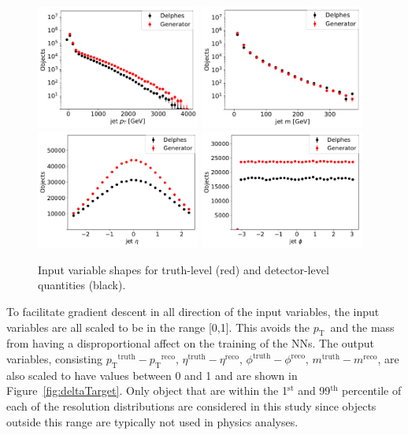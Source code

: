 \documentclass[showpacs,showkeys,preprint,prd,nofootinbib,linenumbers,12pt]{revtex4-1}
\def\pt{\ensuremath{p_{\mathrm{T}}}}
\def\ptRes{\ensuremath{\pt^{\mathrm{truth}}-\pt^{\mathrm{reco}}}}
\def\etaRes{\ensuremath{\eta^{\mathrm{truth}}-\eta^{\mathrm{reco}}}}
\def\phiRes{\ensuremath{\phi^{\mathrm{truth}}-\phi^{\mathrm{reco}}}}
\def\mRes{\ensuremath{m^{\mathrm{truth}}-m^{\mathrm{reco}}}}
\begin{document}
\begin{figure}[h]
  \includegraphics[width=0.48\textwidth]{jet_pT_prescaling_log.pdf}
  \includegraphics[width=0.48\textwidth]{jet_m_prescaling_log.pdf}\\
  \includegraphics[width=0.48\textwidth]{jet_eta_prescaling.pdf}
  \includegraphics[width=0.48\textwidth]{jet_phi_prescaling.pdf}
  \caption{Input variable shapes for truth-level (red) and detector-level quantities (black).}
  \label{fig:nnInputsPrescaling}
\end{figure}

To facilitate gradient descent in all direction of the input variables, the input variables are all scaled to be in the range [0,1]. This avoids the \pt\ and the mass from having a disproportional affect on the training of the NNs. The output variables, consisting \ptRes, \etaRes, \phiRes, \mRes, are also scaled to have values between 0 and 1 and are shown in Figure~\ref{fig:deltaTarget}. Only object that 
are within the 1$^{\mathrm{st}}$ and 99$^{\mathrm{th}}$ percentile of each of the resolution distributions are considered in this study since objects outside this range are typically not used in physics analyses.
\end{document}

